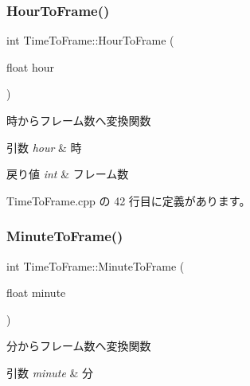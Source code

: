 \mbox{\label{class_time_to_frame_ab2e0cac54c1c7bcab824c27f8d30f3f4}} 
\subsubsection{\texorpdfstring{Hour\+To\+Frame()}{HourToFrame()}}
{\footnotesize\ttfamily int Time\+To\+Frame\+::\+Hour\+To\+Frame (\begin{DoxyParamCaption}\item[{float}]{hour }\end{DoxyParamCaption})\hspace{0.3cm}{\ttfamily [static]}}



時からフレーム数へ変換関数 


\begin{DoxyParams}{引数}
{\em hour} & 時 \\
\hline
\end{DoxyParams}

\begin{DoxyRetVals}{戻り値}
{\em int} & フレーム数 \\
\hline
\end{DoxyRetVals}


 Time\+To\+Frame.\+cpp の 42 行目に定義があります。

\mbox{\label{class_time_to_frame_acbf546584774a378e03270592f0500e8}} 
\subsubsection{\texorpdfstring{Minute\+To\+Frame()}{MinuteToFrame()}}
{\footnotesize\ttfamily int Time\+To\+Frame\+::\+Minute\+To\+Frame (\begin{DoxyParamCaption}\item[{float}]{minute }\end{DoxyParamCaption})\hspace{0.3cm}{\ttfamily [static]}}



分からフレーム数へ変換関数 


\begin{DoxyParams}{引数}
{\em minute} & 分 \\
\hline
\end{DoxyParams}

